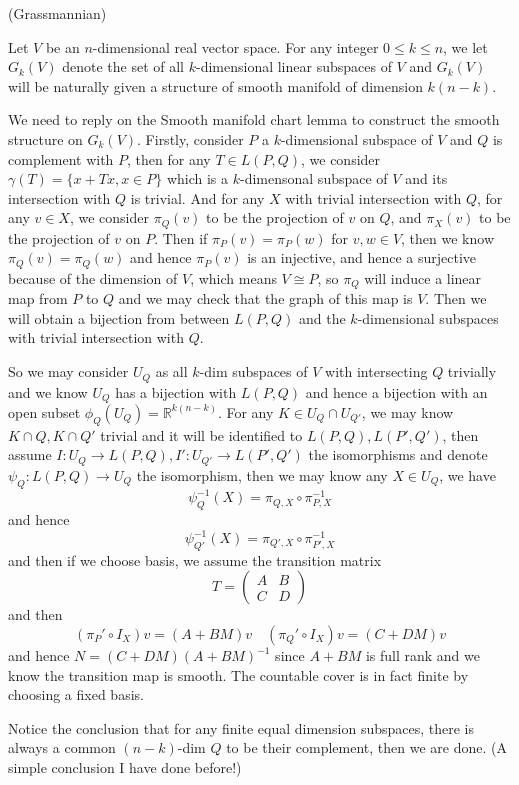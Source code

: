 \begin{definition}(Grassmannian)\par
    Let $V$ be an $n$-dimensional real vector space. For any integer $0\leq k \leq n$, we let $G_k(V)$ denote the set of all $k$-dimensional linear subspaces of $V$ and $G_k(V)$ will be naturally given a structure of smooth manifold of dimension $k(n-k)$.
\end{definition}
\Pf\par
    We need to reply on the Smooth manifold chart lemma to construct the smooth structure on $G_k(V)$. Firstly, consider $P$ a $k$-dimensional subspace of $V$ and $Q$ is complement with $P$, then for any $T\in L(P,Q)$, we consider $\gamma(T) = \{x+Tx, x\in P\}$ which is a $k$-dimensonal subspace of $V$ and its intersection with $Q$ is trivial. And for any $X$ with trivial intersection with $Q$, for any $v\in X$, we consider $\pi_Q(v)$ to be the projection of $v$ on $Q$, and $\pi_X(v)$ to be the projection of $v$ on $P$. Then if $\pi_P(v) = \pi_P(w)$ for $v,w\in V$, then we know $\pi_Q(v) = \pi_Q(w)$ and hence $\pi_P(v)$ is an injective, and hence a surjective because of the dimension of $V$, which means $V\cong P$, so $\pi_Q$ will induce a linear map from $P$ to $Q$ and we may check that the graph of this map is $V$. Then we will obtain a bijection from between $L(P,Q)$ and the $k$-dimensional subspaces with trivial intersection with $Q$.\par
    So we may consider $U_Q$ as all $k$-dim subspaces of $V$ with intersecting $Q$ trivially and we know $U_Q$ has a bijection with $L(P,Q)$ and hence a bijection with an open subset $\phi_Q(U_Q) = \mathbb{R}^{k(n-k)}$. For any $K\in U_Q \cap U_{Q'}$, we may know $K\cap Q, K \cap Q'$ trivial and it will be identified to $L(P,Q),L(P',Q')$, then assume $I:U_Q \to L(P,Q),I' : U_{Q'} \to L(P',Q')$ the isomorphisms and denote $\psi_Q:L(P,Q) \to U_Q$ the isomorphism, then we may know any $X\in U_Q$, we have
    \[
    \psi_Q^{-1}(X) = \pi_{Q,X} \circ \pi_{P,X}^{-1}
    \]
    and hence
    \[
    \psi_{Q'}^{-1}(X) = \pi_{Q',X} \circ \pi_{P',X}^{-1} 
    \]
    and then if we choose basis, we assume the transition matrix
    \[
    T = \left(\begin{array}{c|c}
        A & B \\
        C & D
    \end{array}\right)
    \]
    and then
    \[
        (\pi_P'\circ I_X) v = (A+BM)v \quad (\pi_Q' \circ I_X) v= (C+DM)v
    \]
    and hence $N = (C+DM)(A+BM)^{-1}$ since $A+BM$ is full rank and we know the transition map is smooth. The countable cover is in fact finite by choosing a fixed basis.\par
    Notice the conclusion that for any finite equal dimension subspaces, there is always a common $(n-k)$-dim $Q$ to be their complement, then we are done. (A simple conclusion I have done before!)
    
